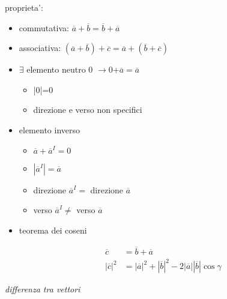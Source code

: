 \documentclass{book}
\begin{document}
proprieta':
\begin{itemize}
    \item commutativa: $\overline{a}+\overline{b}=\overline{b}+\overline{a}$
    \item associativa: $(\overline{a}+\overline{b})+\overline{c}=\overline{a}+(\overline{b}+\overline{c})$
    \item $\exists$ elemento neutro 0 $\xrightarrow{}$0+$\overline{a}=\overline{a}$
    \begin{itemize}
        \item |0|=0
        \item direzione e verso non specifici 
    \end{itemize}
    \item elemento inverso 
    \begin{itemize}
        \item $\overline{a}+\overline{a}^I=0$
        \item $|\overline{a}^I|=\overline{a}$\
        \item direzione $\overline{a}^I = $ direzione $\overline{a}$
        \item verso $\overline{a}^I \neq $ verso $\overline{a}$
    \end{itemize}
    \item teorema dei coseni
\begin{figure}[!ht]
\centering
\begin{minipage}{0.4\textwidth}
    \centering
    \label{fig:my_label}
\end{minipage}%
\hfill
\begin{minipage}{0.45\textwidth}
    \centering
    \vspace{-0.5cm}
    \begin{align*}
        \overline{c} &= \overline{b} + \overline{a}\\
        |\overline{c}|^2 &= |\overline{a}|^2 + |\overline{b}|^2 - 2|\overline{a}||\overline{b}|\cos\gamma
    \end{align*}
\end{minipage}
\end{figure}

\end{itemize}
\textit{differenza tra vettori}
\end{document}
